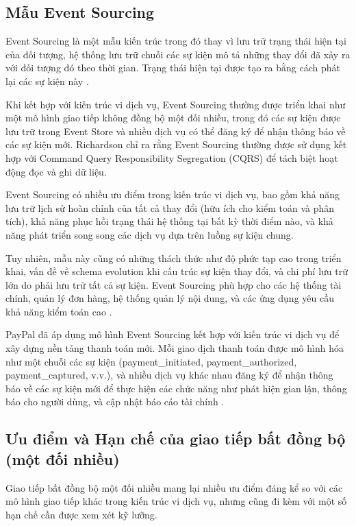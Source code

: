 \subsection{Mẫu Event Sourcing}
Event Sourcing là một mẫu kiến trúc trong đó thay vì lưu trữ trạng thái hiện tại của đối tượng, hệ thống lưu trữ chuỗi các sự kiện mô tả những thay đổi đã xảy ra với đối tượng đó theo thời gian. Trạng thái hiện tại được tạo ra bằng cách phát lại các sự kiện này \cite{fowler2002}.

Khi kết hợp với kiến trúc vi dịch vụ, Event Sourcing thường được triển khai như một mô hình giao tiếp không đồng bộ một đối nhiều, trong đó các sự kiện được lưu trữ trong Event Store và nhiều dịch vụ có thể đăng ký để nhận thông báo về các sự kiện mới. Richardson \cite{richardson2019} chỉ ra rằng Event Sourcing thường được sử dụng kết hợp với Command Query Responsibility Segregation (CQRS) để tách biệt hoạt động đọc và ghi dữ liệu.

Event Sourcing có nhiều ưu điểm trong kiến trúc vi dịch vụ, bao gồm khả năng lưu trữ lịch sử hoàn chỉnh của tất cả thay đổi (hữu ích cho kiểm toán và phân tích), khả năng phục hồi trạng thái hệ thống tại bất kỳ thời điểm nào, và khả năng phát triển song song các dịch vụ dựa trên luồng sự kiện chung.

Tuy nhiên, mẫu này cũng có những thách thức như độ phức tạp cao trong triển khai, vấn đề về schema evolution khi cấu trúc sự kiện thay đổi, và chi phí lưu trữ lớn do phải lưu trữ tất cả sự kiện. Event Sourcing phù hợp cho các hệ thống tài chính, quản lý đơn hàng, hệ thống quản lý nội dung, và các ứng dụng yêu cầu khả năng kiểm toán cao \cite{richardson2019}.

PayPal đã áp dụng mô hình Event Sourcing kết hợp với kiến trúc vi dịch vụ để xây dựng nền tảng thanh toán mới. Mỗi giao dịch thanh toán được mô hình hóa như một chuỗi các sự kiện (payment\_initiated, payment\_authorized, payment\_captured, v.v.), và nhiều dịch vụ khác nhau đăng ký để nhận thông báo về các sự kiện mới để thực hiện các chức năng như phát hiện gian lận, thông báo cho người dùng, và cập nhật báo cáo tài chính \cite{raman2016}.

\subsection{Ưu điểm và Hạn chế của giao tiếp bất đồng bộ (một đối nhiều)}
Giao tiếp bất đồng bộ một đối nhiều mang lại nhiều ưu điểm đáng kể so với các mô hình giao tiếp khác trong kiến trúc vi dịch vụ, nhưng cũng đi kèm với một số hạn chế cần được xem xét kỹ lưỡng.

